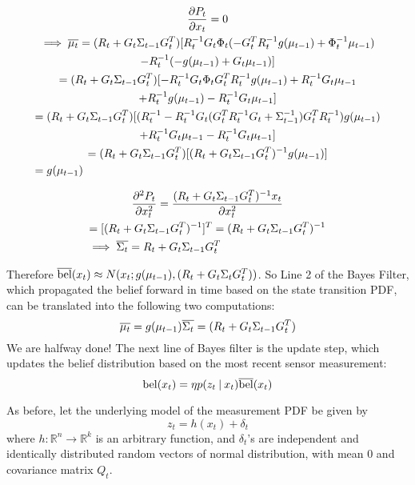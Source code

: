 \begin{multline*}
\frac{\partial P_t}{\partial x_t} = 0 \\
\implies \overline{\mu_t} = (R_t + G_t\Sigma_{t-1}G_t^T) [R_t^{-1}G_t\Phi_t(-G_t^TR_t^{-1}g(\mu_{t-1}) + \Phi_t^{-1}\mu_{t-1}) \\ - R_t^{-1}(-g(\mu_{t-1}) + G_t\mu_{t-1})] \\
= (R_t + G_t\Sigma_{t-1}G_t^T) [-R_t^{-1}G_t\Phi_tG_t^TR_t^{-1}g(\mu_{t-1}) + R_t^{-1}G_t\mu_{t-1} \\ + R_t^{-1}g(\mu_{t-1}) - R_t^{-1}G_t\mu_{t-1}] \\
= (R_t + G_t\Sigma_{t-1}G_t^T) [(R_t^{-1} - R_t^{-1}G_t(G_t^TR_t^{-1}G_t + \Sigma_{t-1}^{-1})G_t^TR_t^{-1})g(\mu_{t-1}) \\
+ R_t^{-1}G_t\mu_{t-1} - R_t^{-1}G_t\mu_{t-1}] \\
= (R_t + G_t\Sigma_{t-1}G_t^T)[(R_t + G_t\Sigma_{t-1}G_t^T)^{-1} g(\mu_{t-1})] \\
= g(\mu_{t-1}) \hfill
\end{multline*}

\begin{multline*}
\frac{\partial^2 P_t }{\partial x_t^2} = \frac{(R_t + G_t\Sigma_{t-1}G_t^T)^{-1}x_t}{\partial x_t^2} \\
= [(R_t + G_t\Sigma_{t-1}G_t^T)^{-1}]^T = (R_t + G_t\Sigma_{t-1}G_t^T)^{-1} \\
\implies \overline{\Sigma_t} = R_t + G_t\Sigma_{t-1}G_t^T \hfill
\end{multline*}

Therefore \(\overline{\mathrm{bel}}(x_t) \approx N(x_t;g(\mu_{t-1}),(R_t + G_t\Sigma_tG_t^T))\). So Line 2 of the Bayes Filter, which propagated the belief forward in time based on the state transition PDF, can be translated into the following two computations:
\[
\overline{\mu_t} = g(\mu_{t-1}) \\
\overline{\Sigma_t} = (R_t + G_t\Sigma_{t-1}G_t^T)
\]
We are halfway done! The next line of Bayes filter is the update step, which updates the belief distribution based on the most recent sensor measurement:
\[
\mathrm{bel}(x_t) = \eta p(z_t \mathbin{\vert} x_t) \overline{\mathrm{bel}}(x_t)
\]

As before, let the underlying model of the measurement PDF be given by \[z_t =  h(x_t) + \delta_t\] where \(h: \mathbb{R}^n \to \mathbb{R}^k\) is an arbitrary function, and \(\delta_t\)'s are independent and identically distributed random vectors of normal distribution, with mean 0 and covariance matrix \(Q_t\).

